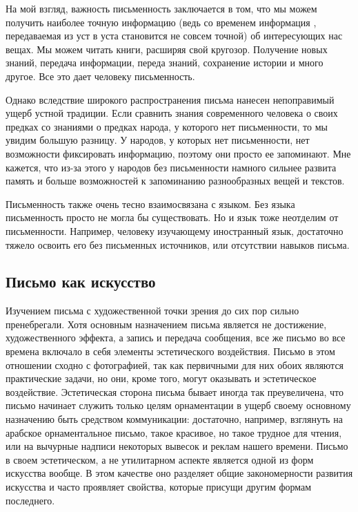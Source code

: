   На мой взгляд, важность письменность заключается в том, что мы можем получить
  наиболее точную информацию (ведь со временем информация , передаваемая из уст
  в уста становится не совсем точной) об интересующих нас вещах. Мы можем
  читать книги, расширяя свой кругозор. Получение новых знаний, передача
  информации, переда знаний, сохранение истории и много другое. Все это дает
  человеку письменность.
  
  Однако вследствие широкого распространения письма нанесен непоправимый ущерб
  устной традиции. Если сравнить знания современного человека о своих предках
  со знаниями о предках народа, у которого нет письменности, то мы увидим
  большую разницу. У народов, у которых нет письменности, нет возможности
  фиксировать информацию, поэтому они просто ее запоминают. Мне кажется, что
  из-за этого у народов без письменности намного сильнее развита память и
  больше возможностей к запоминанию разнообразных вещей и текстов.
  
  Письменность также очень тесно взаимосвязана с языком. Без языка письменность
  просто не могла бы существовать. Но и язык тоже неотделим от письменности.
  Например, человеку изучающему иностранный язык, достаточно тяжело освоить
  его без письменных источников, или отсутствии навыков письма.
  
  \subsection{Письмо как искусство}
  
  Изучением письма с художественной точки зрения до сих пор сильно
  пренебрегали. Хотя основным назначением письма является не достижение,
  художественного эффекта, а запись и передача сообщения, все же письмо во все
  времена включало в себя элементы эстетического воздействия. Письмо в этом
  отношении сходно с фотографией, так как первичными для них обоих являются
  практические задачи, но они, кроме того, могут оказывать и эстетическое
  воздействие. Эстетическая сторона письма бывает иногда так преувеличена, что
  письмо начинает служить только целям орнаментации в ущерб своему основному
  назначению быть средством коммуникации: достаточно, например, взглянуть на
  арабское орнаментальное письмо, такое красивое, но такое трудное для чтения,
  или на вычурные надписи некоторых вывесок и реклам нашего времени. Письмо в
  своем эстетическом, а не утилитарном аспекте является одной из форм искусства
  вообще. В этом качестве оно разделяет общие закономерности развития искусства
  и часто проявляет свойства, которые присущи другим формам последнего.~\cite{bib:1}
  
